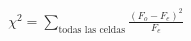 \documentclass[preview]{standalone}
\begin{document}
\begin{align*}
\chi^2 = \sum_{\text{todas las celdas}} \frac{(F_o - F_e)^2}{F_e}
\end{align*}
\end{document}
